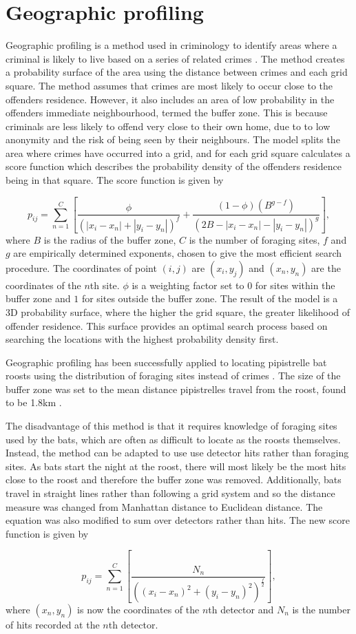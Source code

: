 
\section{Geographic profiling}
Geographic profiling is a method used in criminology to identify areas where a criminal is likely to live based on a series of related crimes
\cite{Rossmo1999}. The method creates a probability surface of the area using the distance between crimes and each grid square. The method assumes that crimes are most likely to occur close to the offenders residence. However, it also includes an area of low probability in the offenders immediate neighbourhood, termed the buffer zone. This is because criminals are less likely to offend very close to their own home, due to to low anonymity and the risk of being seen by their neighbours. The model splits the area where crimes have occurred into a grid, and for each grid square calculates a score function which describes the probability density of the offenders residence being in that square. The score function is given by

\begin{equation}
p_{ij} = \sum_{n=1}^{C}\left[ \frac{\phi}{\left(|x_i - x_n| + |y_i - y_n|\right)^f} + \frac{(1-\phi)(B^{g-f})}{\left(2B - |x_i - x_n| - |y_i - y_n|\right)^g}    \right]  ,
\label{eqn:geo}
\end{equation}
%
where $B$ is the radius of the buffer zone, $C$ is the number of foraging sites, $f$ and $g$ are empirically determined exponents, chosen to give the most efficient search procedure. The coordinates of point $(i,j)$ are $(x_i,y_j)$ and $(x_n,y_n)$ are the coordinates of the $n$th site. $\phi$ is a weighting factor set to $0$ for sites within the buffer zone and $1$ for sites outside the buffer zone. The result of the model is a 3D probability surface, where the higher the grid square, the greater likelihood of offender residence. This surface provides an optimal search process based on searching the locations with the highest probability density first.

Geographic profiling has been successfully applied to locating pipistrelle bat roosts using the distribution of foraging sites instead of crimes \cite{Comber2006}. The size of the buffer zone was set to the mean distance pipistrelles travel from the roost, found to be 1.8km \cite{Racey1985}.

The disadvantage of this method is that it requires knowledge of foraging sites
used by the bats, which are often as difficult to locate as the roosts themselves. Instead, the method can be adapted to use use detector hits rather than foraging sites. As bats start the night at the roost, there will most likely be the most hits close to the roost and therefore the buffer zone was removed. Additionally, bats travel in straight lines rather than following a grid system and so the distance measure was changed from Manhattan distance to Euclidean distance. The equation was also modified to sum over detectors rather than hits. The new score function is given by

\begin{equation}
p_{ij} = \sum_{n=1}^{C}\left[ \frac{N_n}{\left((x_i - x_n)^2 + (y_i - y_n)^2\right) ^{\frac{f}{2}}   }   \right] ,
\label{eqn:geo2}
\end{equation}
%
where $(x_n,y_n)$ is now the coordinates of the $n$th detector and $N_n$ is the number of hits recorded at the $n$th detector.
